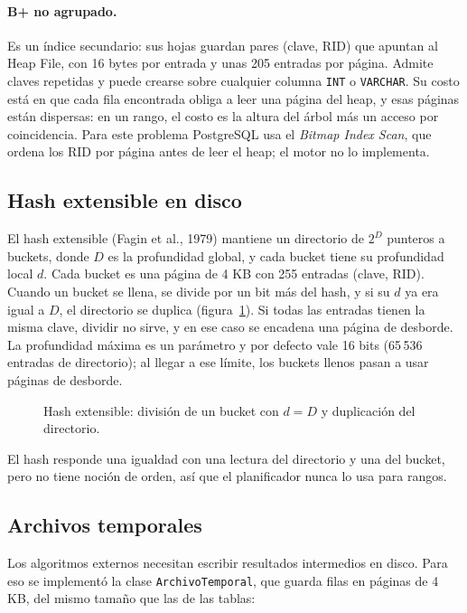 \documentclass[11pt,a4paper]{article}
\begin{document}
\paragraph{B+ no agrupado.} Es un índice secundario: sus hojas guardan pares (clave, RID) que apuntan al Heap File, con 16 bytes por entrada y unas 205 entradas por página. Admite claves repetidas y puede crearse sobre cualquier columna \texttt{INT} o \texttt{VARCHAR}. Su costo está en que cada fila encontrada obliga a leer una página del heap, y esas páginas están dispersas: en un rango, el costo es la altura del árbol más un acceso por coincidencia. Para este problema PostgreSQL usa el \emph{Bitmap Index Scan}, que ordena los RID por página antes de leer el heap; el motor no lo implementa.

\subsection{Hash extensible en disco}

El hash extensible (Fagin et al., 1979) mantiene un directorio de $2^D$ punteros a buckets, donde $D$ es la profundidad global, y cada bucket tiene su profundidad local $d$. Cada bucket es una página de 4 KB con 255 entradas (clave, RID). Cuando un bucket se llena, se divide por un bit más del hash, y si su $d$ ya era igual a $D$, el directorio se duplica (figura~\ref{fig:hash}). Si todas las entradas tienen la misma clave, dividir no sirve, y en ese caso se encadena una página de desborde. La profundidad máxima es un parámetro y por defecto vale 16 bits (65\,536 entradas de directorio); al llegar a ese límite, los buckets llenos pasan a usar páginas de desborde.

\begin{figure}[!htbp]
\centering

\caption{Hash extensible: división de un bucket con $d = D$ y duplicación del directorio.}
\label{fig:hash}
\end{figure}

El hash responde una igualdad con una lectura del directorio y una del bucket, pero no tiene noción de orden, así que el planificador nunca lo usa para rangos.

\subsection{Archivos temporales}
\label{sec:temporales}

Los algoritmos externos necesitan escribir resultados intermedios en disco. Para eso se implementó la clase \texttt{ArchivoTemporal}, que guarda filas en páginas de 4 KB, del mismo tamaño que las de las tablas:
\end{document}
